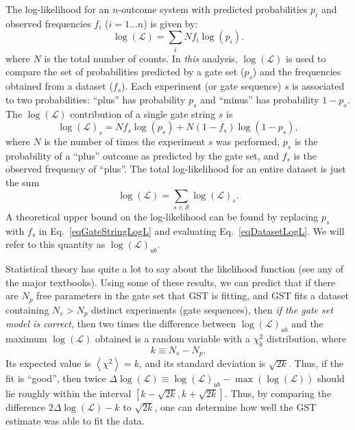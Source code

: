 \documentclass{article}[11pt]
\newcommand{\expec}[1]{\ensuremath{\left\langle#1\right\rangle}}
\begin{document}
{The log-likelihood for an $n$-outcome system with predicted probabilities $p_i$ and observed frequencies $f_i$ ($i=1\ldots n$) is given by:
\begin{equation}
\log(\mathcal{L}) = \sum_i N f_i \log(p_i).
\end{equation}
where $N$ is the total number of counts. In \emph{this} analysis, $\log(\mathcal{L})$ is used to compare the set of probabilities predicted by a gate set ($p_s$) and the frequencies obtained from a dataset ($f_s$).  Each experiment (or gate sequence) $s$ is associated to two probabilities:  ``plus'' has probability $p_s$ and ``minus'' has probability $1-p_s$.  The $\log(\mathcal{L})$ contribution of a single gate string $s$ is
\begin{equation}
\log(\mathcal{L})_s = N f_s \log(p_s) + N (1-f_s) \log(1-p_s),\label{eqGateStringLogL}
\end{equation}
where $N$ is the number of times the experiment $s$ was performed, $p_s$ is the probability of a ``plus'' outcome as predicted by the gate set, and $f_s$ is the observed frequency of ``plus''.  The total log-likelihood for an entire dataset is just the sum 
\begin{equation}
\log(\mathcal{L}) = \sum_{s\in\mathcal{S}}{ \log(\mathcal{L})_s}.\label{eqDatasetLogL}
\end{equation}
A theoretical upper bound on the log-likelihood can be found by replacing $p_s$ with $f_s$ in Eq.~\ref{eqGateStringLogL} and evaluating Eq.~\ref{eqDatasetLogL}.  We will refer to this quantity as $\log(\mathcal{L})_{ub}$.

Statistical theory has quite a lot to say about the likelihood function (see any of the major textbooks).  Using some of these results, we can predict that if there are $N_p$ free parameters in the gate set that GST is fitting, and GST fits a dataset containing $N_s > N_p$ distinct experiments (gate sequences), then \emph{if the gate set model is correct}, then two times the difference between $\log(\mathcal{L})_{ub}$ and the maximum $\log(\mathcal{L})$ obtained is a random variable with a $\chi^2_{k}$ distribution, where 
$$k \equiv N_s - N_p.$$
Its expected value is $\expec{\chi^2}=k$, and its standard deviation is $\sqrt{2k}$.  Thus, if the fit is ``good'', then twice $\Delta\log(\mathcal{L}) \equiv \log(\mathcal{L})_{ub} - \max(\log(\mathcal{L}))$ should lie roughly within the interval $[k-\sqrt{2k},k+\sqrt{2k}]$.
Thus, by comparing the difference $2\Delta\log(\mathcal{L}) - k$ to $\sqrt{2k}$, one can determine how well the GST estimate was able to fit the data.

}
\end{document}
